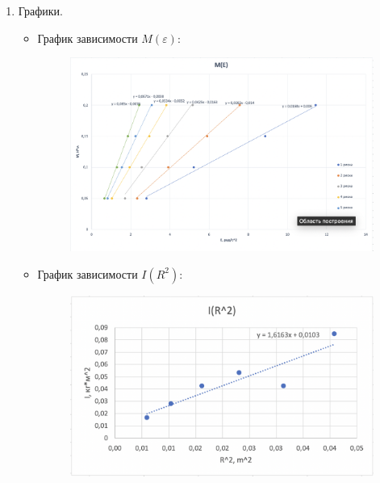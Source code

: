\documentclass[12pt]{article}
\begin{document}
\begin{enumerate}[label=\arabic*)]
\begin{itemize}
            
            \end{itemize}
        

        
        \item Графики.
        \begin{itemize}
            \item График зависимости $M(\varepsilon)$:
                \begin{figure}[h]
                
                    \includegraphics[width=1.05\linewidth]{1.png}
                \end{figure}
            \item График зависимости $I(R^2)$:
                \begin{figure}[H]
                    \centering
                    \includegraphics[width=1.05\linewidth]{2.png}
                    \label{fig:mpr}
                \end{figure}
        \end{itemize}
        

\end{enumerate}
\end{document}

